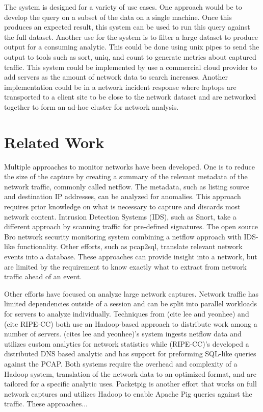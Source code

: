\documentclass{article}
\begin{document}
\begin{multicols}{2}
The system is designed for a variety of use cases. One approach would be to develop the query on a subset of the data on a single machine.  Once this produces an expected result, this system can be used to run this query against the full dataset.  Another use for the system is to filter a large dataset to produce output for a consuming analytic. This could be done using unix pipes to send the output to tools such as sort, uniq, and count to generate metrics about captured traffic.  This system could be implemented by use a commercial cloud provider to add servers as the amount of network data to search increases. Another implementation could be in a network incident response where laptops are transported to a client site to be close to the network dataset and are networked together to form an ad-hoc cluster for network analysis.

\section{Related Work}

Multiple approaches to monitor networks have been developed. One is to reduce the size of the capture by creating a summary of the relevant metadata of the network traffic, commonly called netflow.  The metadata, such as listing source and destination IP addresses, can be analyzed for anomalies.  This approach requires prior knowledge on what is necessary to capture and discards most network content. Intrusion Detection Systems (IDS), such as Snort, take a different approach by scanning traffic for pre-defined signatures. The open source Bro network security monitoring system combining a netflow approach with IDS-like functionality.  Other efforts, such as pcap2sql, translate relevant network events into a database. These approaches can provide insight into a network, but are limited by the requirement to know exactly what to extract from network traffic ahead of an event. 

Other efforts have focused on analyze large network captures. Network traffic has limited dependencies outside of a session and can be split into parallel workloads for servers to analyze individually.  Techniques from (cite lee and yeonhee) and (cite RIPE-CC) both use an Hadoop-based approach to distribute work among a number of servers.  (cites lee and yeonhee)'s system ingests netflow data and utilizes custom analytics for network statistics while (RIPE-CC)'s developed a distributed DNS based analytic and has support for preforming SQL-like queries against the PCAP.  Both systems require the overhead and complexity of a Hadoop system, translation of the network data to an optimized format, and are tailored for a specific analytic uses.  Packetpig is another effort that works on full network captures and utilizes Hadoop to enable Apache Pig queries against the traffic.  These approaches...


\end{multicols}
\end{document}
